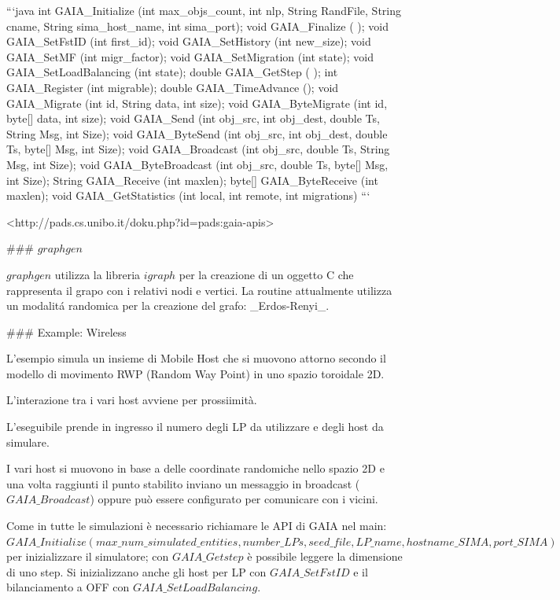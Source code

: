 ```java
int     GAIA\_Initialize (int max\_objs\_count, int nlp, String RandFile, String cname, String sima\_host\_name, int sima\_port);
void    GAIA\_Finalize ( );
void    GAIA\_SetFstID (int first\_id);
void    GAIA\_SetHistory (int new\_size);
void    GAIA\_SetMF (int migr\_factor);
void    GAIA\_SetMigration (int state);
void    GAIA\_SetLoadBalancing (int state);
double  GAIA\_GetStep ( );
int     GAIA\_Register (int migrable);
double  GAIA\_TimeAdvance ();
void    GAIA\_Migrate (int id, String data, int size);
void    GAIA\_ByteMigrate (int id, byte[] data, int size);
void    GAIA\_Send (int obj\_src, int obj\_dest, double Ts, String Msg, int Size);
void    GAIA\_ByteSend (int obj\_src, int obj\_dest, double Ts, byte[] Msg, int Size);
void    GAIA\_Broadcast (int obj\_src, double Ts, String Msg, int Size);
void    GAIA\_ByteBroadcast (int obj\_src, double Ts, byte[] Msg, int Size);
String  GAIA\_Receive (int maxlen);
byte[]  GAIA\_ByteReceive (int maxlen);
void    GAIA\_GetStatistics (int local, int remote, int migrations)
```

<http://pads.cs.unibo.it/doku.php?id=pads:gaia-apis>

### $graphgen$

$graphgen$ utilizza la libreria $igraph$ per la creazione di un oggetto C che rappresenta il grapo con i relativi nodi e vertici. La routine attualmente utilizza un modalitá randomica per la creazione del grafo: \_Erdos-Renyi\_.

### Example: Wireless

L'esempio simula un insieme di Mobile Host che si muovono attorno secondo il modello di movimento RWP (Random Way Point) in uno spazio toroidale 2D.

L'interazione tra i vari host avviene per prossiimità.

L'eseguibile prende in ingresso il numero degli LP da utilizzare e degli host da simulare.

I vari host si muovono in base a delle coordinate randomiche nello spazio 2D e una volta raggiunti il punto stabilito inviano un messaggio in broadcast ($GAIA\_Broadcast$) oppure può essere configurato per comunicare con i vicini.

Come in tutte le simulazioni è necessario richiamare le API di GAIA nel main: $GAIA\_Initialize(max\_num\_simulated\_entities, number\_LPs, seed\_file, LP\_name, hostname\_SIMA, port\_SIMA)$ per inizializzare il simulatore; con $GAIA\_Getstep$ è possibile leggere la dimensione di uno step. Si inizializzano anche gli host per LP con $GAIA\_SetFstID$ e il bilanciamento a OFF con $GAIA\_SetLoadBalancing$.

